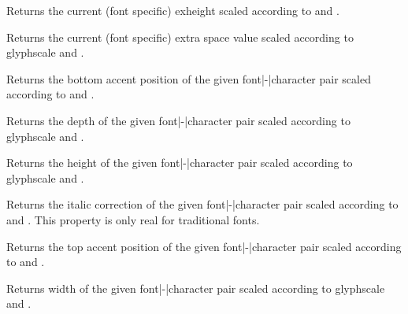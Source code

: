 \stopnewprimitive

\startnewprimitive[title={\prm {scaledexheight}}]

Returns the current (font specific) exheight scaled according to 
and .

\stopnewprimitive

\startnewprimitive[title={\prm {scaledextraspace}}]

Returns the current (font specific) extra space value scaled according to \prm
{glyphscale} and .

\stopnewprimitive

\startnewprimitive[title={\prm {scaledfontcharba}}]

Returns the bottom accent position of the given font|-|character pair scaled
according to  and .

\stopnewprimitive

\startnewprimitive[title={\prm {scaledfontchardp}}]

Returns the depth of the given font|-|character pair scaled according to \prm
{glyphscale} and .

\stopnewprimitive

\startnewprimitive[title={\prm {scaledfontcharht}}]

Returns the height of the given font|-|character pair scaled according to \prm
{glyphscale} and .

\stopnewprimitive

\startnewprimitive[title={\prm {scaledfontcharic}}]

Returns the italic correction of the given font|-|character pair scaled according
to  and . This property is only real for
traditional fonts.

\stopnewprimitive

\startnewprimitive[title={\prm {scaledfontcharta}}]

Returns the top accent position of the given font|-|character pair scaled
according to  and .

\stopnewprimitive

\startnewprimitive[title={\prm {scaledfontcharwd}}]

Returns width of the given font|-|character pair scaled according to \prm
{glyphscale} and .

\stopnewprimitive

